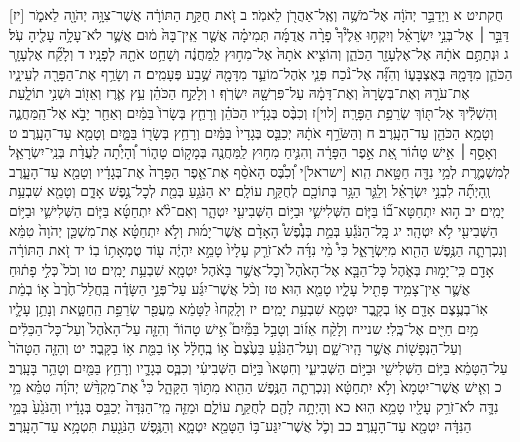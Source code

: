 \documentclass[twoside, openany, parskip=half, 11pt]{book}
\begin{document}
[יז] חֻקתיט א וַיְדַבֵּ֣ר יְהֹוָ֔ה אֶל־מֹשֶׁ֥ה וְאֶֽל־אַהֲרֹ֖ן לֵאמֹֽר׃ ב זֹ֚את חֻקַּ֣ת הַתּוֹרָ֔ה אֲשֶׁר־צִוָּ֥ה יְהֹוָ֖ה לֵאמֹ֑ר דַּבֵּ֣ר ׀ אֶל־בְּנֵ֣י יִשְׂרָאֵ֗ל וְיִקְח֣וּ אֵלֶ֩יךָ֩ פָרָ֨ה אֲדֻמָּ֜ה תְּמִימָ֗ה אֲשֶׁ֤ר אֵֽין־בָּהּ֙ מ֔וּם אֲשֶׁ֛ר לֹא־עָלָ֥ה עָלֶ֖יהָ עֹֽל׃ ג וּנְתַתֶּ֣ם אֹתָ֔הּ אֶל־אֶלְעָזָ֖ר הַכֹּהֵ֑ן וְהוֹצִ֤יא אֹתָהּ֙ אֶל־מִח֣וּץ לַֽמַּחֲנֶ֔ה וְשָׁחַ֥ט אֹתָ֖הּ לְפָנָֽיו׃ ד וְלָקַ֞ח אֶלְעָזָ֧ר הַכֹּהֵ֛ן מִדָּמָ֖הּ בְּאֶצְבָּע֑וֹ וְהִזָּ֞ה אֶל־נֹ֨כַח פְּנֵ֧י אֹֽהֶל־מוֹעֵ֛ד מִדָּמָ֖הּ שֶׁ֥בַע פְּעָמִֽים׃ ה וְשָׂרַ֥ף אֶת־הַפָּרָ֖ה לְעֵינָ֑יו אֶת־עֹרָ֤הּ וְאֶת־בְּשָׂרָהּ֙ וְאֶת־דָּמָ֔הּ עַל־פִּרְשָׁ֖הּ יִשְׂרֹֽף׃ ו וְלָקַ֣ח הַכֹּהֵ֗ן עֵ֥ץ אֶ֛רֶז וְאֵז֖וֹב וּשְׁנִ֣י תוֹלָ֑עַת וְהִשְׁלִ֕יךְ אֶל־תּ֖וֹךְ שְׂרֵפַ֥ת הַפָּרָֽה׃ [לוי]ז וְכִבֶּ֨ס בְּגָדָ֜יו הַכֹּהֵ֗ן וְרָחַ֤ץ בְּשָׂרוֹ֙ בַּמַּ֔יִם וְאַחַ֖ר יָבֹ֣א אֶל־הַֽמַּחֲנֶ֑ה וְטָמֵ֥א הַכֹּהֵ֖ן עַד־הָעָֽרֶב׃ ח וְהַשֹּׂרֵ֣ף אֹתָ֔הּ יְכַבֵּ֤ס בְּגָדָיו֙ בַּמַּ֔יִם וְרָחַ֥ץ בְּשָׂר֖וֹ בַּמָּ֑יִם וְטָמֵ֖א עַד־הָעָֽרֶב׃ ט וְאָסַ֣ף ׀ אִ֣ישׁ טָה֗וֹר אֵ֚ת אֵ֣פֶר הַפָּרָ֔ה וְהִנִּ֛יחַ מִח֥וּץ לַֽמַּחֲנֶ֖ה בְּמָק֣וֹם טָה֑וֹר וְ֠הָיְתָ֠ה לַעֲדַ֨ת בְּנֵֽי־יִשְׂרָאֵ֧ל לְמִשְׁמֶ֛רֶת לְמֵ֥י נִדָּ֖ה חַטָּ֥את הִֽוא׃ [ישראל]י וְ֠כִבֶּ֠ס הָאֹסֵ֨ף אֶת־אֵ֤פֶר הַפָּרָה֙ אֶת־בְּגָדָ֔יו וְטָמֵ֖א עַד־הָעָ֑רֶב וְֽהָיְתָ֞ה לִבְנֵ֣י יִשְׂרָאֵ֗ל וְלַגֵּ֛ר הַגָּ֥ר בְּתוֹכָ֖ם לְחֻקַּ֥ת עוֹלָֽם׃ יא הַנֹּגֵ֥עַ בְּמֵ֖ת לְכׇל־נֶ֣פֶשׁ אָדָ֑ם וְטָמֵ֖א שִׁבְעַ֥ת יָמִֽים׃ יב ה֣וּא יִתְחַטָּא־ב֞וֹ בַּיּ֧וֹם הַשְּׁלִישִׁ֛י וּבַיּ֥וֹם הַשְּׁבִיעִ֖י יִטְהָ֑ר וְאִם־לֹ֨א יִתְחַטָּ֜א בַּיּ֧וֹם הַשְּׁלִישִׁ֛י וּבַיּ֥וֹם הַשְּׁבִיעִ֖י לֹ֥א יִטְהָֽר׃ יג כׇּֽל־הַנֹּגֵ֡עַ בְּמֵ֣ת בְּנֶ֩פֶשׁ֩ הָאָדָ֨ם אֲשֶׁר־יָמ֜וּת וְלֹ֣א יִתְחַטָּ֗א אֶת־מִשְׁכַּ֤ן יְהֹוָה֙ טִמֵּ֔א וְנִכְרְתָ֛ה הַנֶּ֥פֶשׁ הַהִ֖וא מִיִּשְׂרָאֵ֑ל כִּי֩ מֵ֨י נִדָּ֜ה לֹא־זֹרַ֤ק עָלָיו֙ טָמֵ֣א יִהְיֶ֔ה ע֖וֹד טֻמְאָת֥וֹ בֽוֹ׃ יד זֹ֚את הַתּוֹרָ֔ה אָדָ֖ם כִּֽי־יָמ֣וּת בְּאֹ֑הֶל כׇּל־הַבָּ֤א אֶל־הָאֹ֙הֶל֙ וְכׇל־אֲשֶׁ֣ר בָּאֹ֔הֶל יִטְמָ֖א שִׁבְעַ֥ת יָמִֽים׃ טו וְכֹל֙ כְּלִ֣י פָת֔וּחַ אֲשֶׁ֛ר אֵין־צָמִ֥יד פָּתִ֖יל עָלָ֑יו טָמֵ֖א הֽוּא׃ טז וְכֹ֨ל אֲשֶׁר־יִגַּ֜ע עַל־פְּנֵ֣י הַשָּׂדֶ֗ה בַּֽחֲלַל־חֶ֙רֶב֙ א֣וֹ בְמֵ֔ת אֽוֹ־בְעֶ֥צֶם אָדָ֖ם א֣וֹ בְקָ֑בֶר יִטְמָ֖א שִׁבְעַ֥ת יָמִֽים׃ יז וְלָֽקְחוּ֙ לַטָּמֵ֔א מֵעֲפַ֖ר שְׂרֵפַ֣ת הַֽחַטָּ֑את וְנָתַ֥ן עָלָ֛יו מַ֥יִם חַיִּ֖ים אֶל־כֶּֽלִי׃ שנייח וְלָקַ֨ח אֵז֜וֹב וְטָבַ֣ל בַּמַּ֘יִם֮ אִ֣ישׁ טָהוֹר֒ וְהִזָּ֤ה עַל־הָאֹ֙הֶל֙ וְעַל־כׇּל־הַכֵּלִ֔ים וְעַל־הַנְּפָשׁ֖וֹת אֲשֶׁ֣ר הָֽיוּ־שָׁ֑ם וְעַל־הַנֹּגֵ֗עַ בַּעֶ֙צֶם֙ א֣וֹ בֶֽחָלָ֔ל א֥וֹ בַמֵּ֖ת א֥וֹ בַקָּֽבֶר׃ יט וְהִזָּ֤ה הַטָּהֹר֙ עַל־הַטָּמֵ֔א בַּיּ֥וֹם הַשְּׁלִישִׁ֖י וּבַיּ֣וֹם הַשְּׁבִיעִ֑י וְחִטְּאוֹ֙ בַּיּ֣וֹם הַשְּׁבִיעִ֔י וְכִבֶּ֧ס בְּגָדָ֛יו וְרָחַ֥ץ בַּמַּ֖יִם וְטָהֵ֥ר בָּעָֽרֶב׃ כ וְאִ֤ישׁ אֲשֶׁר־יִטְמָא֙ וְלֹ֣א יִתְחַטָּ֔א וְנִכְרְתָ֛ה הַנֶּ֥פֶשׁ הַהִ֖וא מִתּ֣וֹךְ הַקָּהָ֑ל כִּי֩ אֶת־מִקְדַּ֨שׁ יְהֹוָ֜ה טִמֵּ֗א מֵ֥י נִדָּ֛ה לֹא־זֹרַ֥ק עָלָ֖יו טָמֵ֥א הֽוּא׃ כא וְהָיְתָ֥ה לָהֶ֖ם לְחֻקַּ֣ת עוֹלָ֑ם וּמַזֵּ֤ה מֵֽי־הַנִּדָּה֙ יְכַבֵּ֣ס בְּגָדָ֔יו וְהַנֹּגֵ֙עַ֙ בְּמֵ֣י הַנִּדָּ֔ה יִטְמָ֖א עַד־הָעָֽרֶב׃ כב וְכֹ֛ל אֲשֶׁר־יִגַּע־בּ֥וֹ הַטָּמֵ֖א יִטְמָ֑א וְהַנֶּ֥פֶשׁ הַנֹּגַ֖עַת תִּטְמָ֥א עַד־הָעָֽרֶב׃
\end{document}
